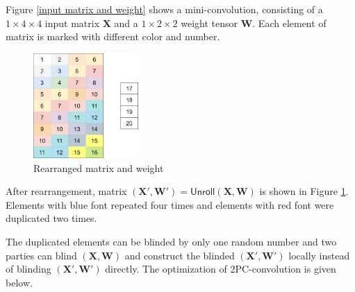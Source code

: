 \documentclass[letterpaper]{article} %
\begin{document}
    Figure \ref{input matrix and weight} shows a mini-convolution,
    consisting of a $1\times 4\times 4$ input matrix $\mathbf{X}$  and a $1\times 2\times 2$ weight tensor $\mathbf{W}$.
    Each element of matrix is marked with different color and number.
    \begin{figure}[htbp]
        \centering
        \includegraphics[width=4cm]{new_unrolling2.png}
        \caption{Rearranged matrix and weight}
        \label{rearrangement of matrix and weight}
    \end{figure}

    After rearrangement, matrix $(\mathbf{X}',\mathbf{W}')=\mathsf{Unroll}(\mathbf{X},\mathbf{W})$
    is shown in Figure \ref{rearrangement of matrix and weight}.
    Elements with blue font repeated four times
    and elements with red font were duplicated two times.

    The duplicated elements can be blinded by only one random number
    and two parties can  blind $(\mathbf{X},\mathbf{W})$ and
    construct the blinded $(\mathbf{X}',\mathbf{W}')$ locally instead of blinding $(\mathbf{X}',\mathbf{W}')$ directly.
    The optimization of 2PC-convolution is given below.
\end{document}
